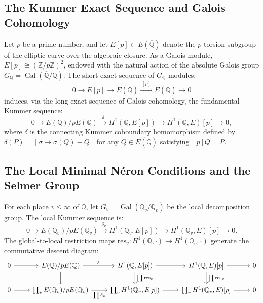 \documentclass[11pt,reqno]{article}
\theoremstyle{plain}
\theoremstyle{definition}
\DeclareMathOperator{\Gal}{Gal}
\begin{document}
\subsection{The Kummer Exact Sequence and Galois Cohomology}

Let $p$ be a prime number, and let $E[p] \subset E(\overline{\mathbb{Q}})$ denote the $p$-torsion subgroup of the elliptic curve over the algebraic closure. As a Galois module, $E[p] \cong (\mathbb{Z}/p\mathbb{Z})^2$, endowed with the natural action of the absolute Galois group $G_\mathbb{Q} = \Gal(\overline{\mathbb{Q}}/\mathbb{Q})$. The short exact sequence of $G_\mathbb{Q}$-modules:
\begin{equation}
    \label{eq:kummer_short}
    0 \longrightarrow E[p] \longrightarrow E(\overline{\mathbb{Q}}) \xrightarrow{\;[p]\;} E(\overline{\mathbb{Q}}) \longrightarrow 0
\end{equation}
induces, via the long exact sequence of Galois cohomology, the fundamental Kummer sequence:
\begin{equation}
    \label{eq:kummer_long}
    0 \longrightarrow E(\mathbb{Q})/p E(\mathbb{Q}) \xrightarrow{\;\delta\;} H^1(\mathbb{Q}, E[p]) \longrightarrow H^1(\mathbb{Q}, E)[p] \longrightarrow 0,
\end{equation}
where $\delta$ is the connecting Kummer coboundary homomorphism defined by $\delta(P) = [\sigma \mapsto \sigma(Q) - Q]$ for any $Q \in E(\overline{\mathbb{Q}})$ satisfying $[p]Q = P$.

\subsection{The Local Minimal Néron Conditions and the Selmer Group}

For each place $v \le \infty$ of $\mathbb{Q}$, let $G_v = \Gal(\overline{\mathbb{Q}}_v/\mathbb{Q}_v)$ be the local decomposition group. The local Kummer sequence is:
\begin{equation}
    0 \longrightarrow E(\mathbb{Q}_v)/p E(\mathbb{Q}_v) \xrightarrow{\;\delta_v\;} H^1(\mathbb{Q}_v, E[p]) \longrightarrow H^1(\mathbb{Q}_v, E)[p] \longrightarrow 0.
\end{equation}
The global-to-local restriction maps $\mathrm{res}_v: H^1(\mathbb{Q}, \cdot) \to H^1(\mathbb{Q}_v, \cdot)$ generate the commutative descent diagram:
\begin{equation}
\begin{tikzcd}
0 \arrow[r] & E(\mathbb{Q})/pE(\mathbb{Q}) \arrow[r, "\delta"] \arrow[d] & H^1(\mathbb{Q}, E[p]) \arrow[r] \arrow[d, "\prod \mathrm{res}_v"] & H^1(\mathbb{Q}, E)[p] \arrow[r] \arrow[d, "\prod \mathrm{res}_v"] & 0 \\
0 \arrow[r] & \prod_v E(\mathbb{Q}_v)/pE(\mathbb{Q}_v) \arrow[r, "\prod \delta_v"'] & \prod_v H^1(\mathbb{Q}_v, E[p]) \arrow[r] & \prod_v H^1(\mathbb{Q}_v, E)[p] \arrow[r] & 0
\end{tikzcd}
\end{equation}
\end{document}
